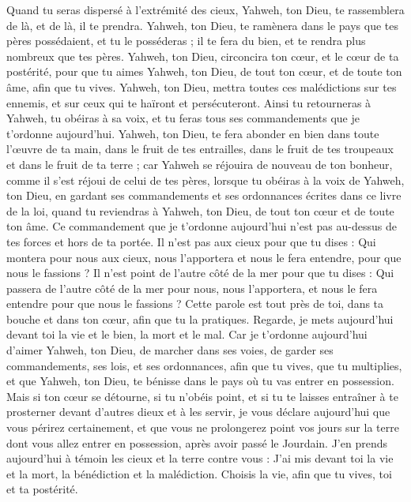 \begin{multicols}{2}
Quand tu seras dispersé à l’extrémité des cieux, Yahweh, ton Dieu, te rassemblera de là, et de là, il te prendra.
Yahweh, ton Dieu, te ramènera dans le pays que tes pères possédaient, et tu le posséderas ; il te fera du bien, et te rendra plus nombreux que tes pères.
Yahweh, ton Dieu, circoncira ton cœur, et le cœur de ta postérité, pour que tu aimes Yahweh, ton Dieu, de tout ton cœur, et de toute ton âme, afin que tu vives.
Yahweh, ton Dieu, mettra toutes ces malédictions sur tes ennemis, et sur ceux qui te haïront et persécuteront.
Ainsi tu retourneras à Yahweh, tu obéiras à sa voix, et tu feras tous ses commandements que je t’ordonne aujourd'hui.
Yahweh, ton Dieu, te fera abonder en bien dans toute l’œuvre de ta main, dans le fruit de tes entrailles, dans le fruit de tes troupeaux et dans le fruit de ta terre ; car Yahweh se réjouira de nouveau de ton bonheur, comme il s'est réjoui de celui de tes pères,
lorsque tu obéiras à la voix de Yahweh, ton Dieu, en gardant ses commandements et ses ordonnances écrites dans ce livre de la loi, quand tu reviendras à Yahweh, ton Dieu, de tout ton cœur et de toute ton âme.
Ce commandement que je t’ordonne aujourd'hui n'est pas au-dessus de tes forces et hors de ta portée.
Il n'est pas aux cieux pour que tu dises : Qui montera pour nous aux cieux, nous l’apportera et nous le fera entendre, pour que nous le fassions ?
Il n'est point de l’autre côté de la mer pour que tu dises : Qui passera de l’autre côté de la mer pour nous, nous l’apportera, et nous le fera entendre pour que nous le fassions ?
Cette parole est tout près de toi, dans ta bouche et dans ton cœur, afin que tu la pratiques.
Regarde, je mets aujourd'hui devant toi la vie et le bien, la mort et le mal.
Car je t’ordonne aujourd'hui d'aimer Yahweh, ton Dieu, de marcher dans ses voies, de garder ses commandements, ses lois, et ses ordonnances, afin que tu vives, que tu multiplies, et que Yahweh, ton Dieu, te bénisse dans le pays où tu vas entrer en possession.
Mais si ton cœur se détourne, si tu n'obéis point, et si tu te laisses entraîner à te prosterner devant d'autres dieux et à les servir,
je vous déclare aujourd'hui que vous périrez certainement, et que vous ne prolongerez point vos jours sur la terre dont vous allez entrer en possession, après avoir passé le Jourdain.
J’en prends aujourd'hui à témoin les cieux et la terre contre vous : J'ai mis devant toi la vie et la mort, la bénédiction et la malédiction. Choisis la vie, afin que tu vives, toi et ta postérité.

\end{multicols}
